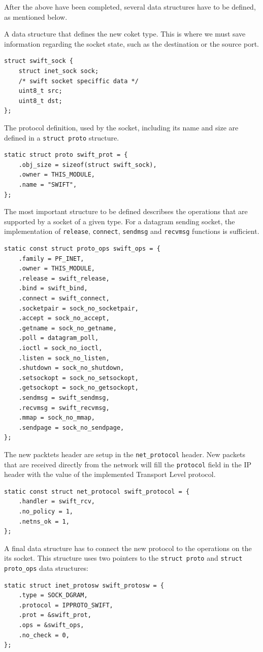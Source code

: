 After the above have been completed, several data structures have to be
defined, as mentioned below.

A data structure that defines the new coket type. This is where we must save
information regarding the socket state, such as the destination or the source
port.
\begin{verbatim}
struct swift_sock {
    struct inet_sock sock;
    /* swift socket speciffic data */
    uint8_t src;
    uint8_t dst;
};
\end{verbatim}

The protocol definition, used by the socket, including its name and size are
defined in a \texttt{struct proto} structure.
\begin{verbatim}
static struct proto swift_prot = {
    .obj_size = sizeof(struct swift_sock),
    .owner = THIS_MODULE,
    .name = "SWIFT",
};
\end{verbatim}

The most important structure to be defined describses the operations that are
supported by a socket of a given type. For a datagram sending socket, the
implementation of \texttt{release}, \texttt{connect}, \texttt{sendmsg} and
\texttt{recvmsg} functions is sufficient.
\begin{verbatim}
static const struct proto_ops swift_ops = {
    .family = PF_INET,
    .owner = THIS_MODULE,
    .release = swift_release,
    .bind = swift_bind,
    .connect = swift_connect,
    .socketpair = sock_no_socketpair,
    .accept = sock_no_accept,
    .getname = sock_no_getname,
    .poll = datagram_poll,
    .ioctl = sock_no_ioctl,
    .listen = sock_no_listen,
    .shutdown = sock_no_shutdown,
    .setsockopt = sock_no_setsockopt,
    .getsockopt = sock_no_getsockopt,
    .sendmsg = swift_sendmsg,
    .recvmsg = swift_recvmsg,
    .mmap = sock_no_mmap,
    .sendpage = sock_no_sendpage,
};
\end{verbatim}

The new packtets header are setup in the \texttt{net\_protocol} header. New
packets that are received directly from the network will fill the
\texttt{protocol} field in the IP header with the value of the implemented
Transport Level protocol.
\begin{verbatim}
static const struct net_protocol swift_protocol = {
    .handler = swift_rcv,
    .no_policy = 1,
    .netns_ok = 1,
};
\end{verbatim}

A final data structure has to connect the new protocol to the operations on
the its socket. This structure uses two pointers to the \texttt{struct proto}
and \texttt{struct proto\_ops} data structures:
\begin{verbatim}
static struct inet_protosw swift_protosw = {
    .type = SOCK_DGRAM,
    .protocol = IPPROTO_SWIFT,
    .prot = &swift_prot,
    .ops = &swift_ops,
    .no_check = 0,
};
\end{verbatim}

